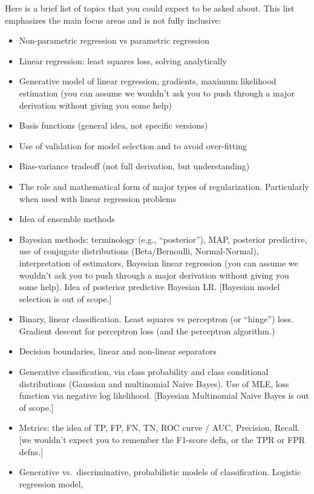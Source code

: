 \documentclass[12pt,letterpaper]{article}
\newcommand{\1}{\mathbbm{1}}
\begin{document}
\noindent 
Here is a brief list of topics that you could expect to be asked about. This list emphasizes the main focus areas and is not fully
inclusive:

\begin{itemize}
\item Non-parametric regression vs parametric regression
\item Linear regression: least squares loss, solving analytically
\item Generative model of linear regression, gradients,
maximum likelihood estimation  (you can assume we 
wouldn't ask you to push through a major derivation 
without giving you some help)
\item Basis functions (general idea, not specific versions)
\item Use of validation for model selection and to
avoid over-fitting
\item Bias-variance tradeoff (not full derivation, but understanding)
\item The role and mathematical form of major types of regularization. Particularly when used with linear regression problems
%
\item Idea of ensemble methods
\item Bayesian methods: terminology (e.g.,
  ``posterior''), MAP, posterior predictive,
use of conjugate distributions (Beta/Bernoulli, Normal-Normal), 
interpretation of estimators, Bayesian linear regression
(you can assume we 
wouldn't ask you to push through a major derivation 
without giving you some help).
Idea of posterior predictive Bayesian LR. [Bayesian model
selection is out of scope.]
%
\item Binary, linear classification. Least squares vs 
perceptron (or ``hinge'') loss. Gradient descent for perceptron loss
(and the perceptron algorithm.)
\item Decision boundaries, linear and non-linear separators
\item Generative classification, via class probability
and class conditional distributions (Gaussian and
multinomial Naive Bayes). Use of MLE, loss function
via negative log likelihood. [Bayesian Multinomial Naive
Bayes is out of scope.]
\item Metrics: the idea of TP, FP, FN, TN, ROC curve / AUC, Precision, Recall. 
[we wouldn't expect
you to remember the F1-score defn, or the TPR or FPR defns.]
\item Generative vs.~discriminative, probabilistic
models of classification. Logistic regression model,

\end{itemize}
\end{document}
